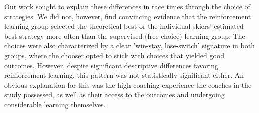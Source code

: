 Our work sought to explain these differences in race times through the choice of strategies. We did not, however,  find convincing evidence that the reinforcement learning group selected the theoretical best or the individual skiers' estimated best strategy more often than the supervised (free choice) learning group. The choices were also characterized by a clear 'win-stay, lose-switch' signature in both groups, where the chooser opted to stick with choices that yielded good outcomes. However, despite significant descriptive differences favoring reinforcement learning, this pattern was not statistically significant either. An obvious explanation for this was the high coaching experience the coaches in the study possessed, as well as their access to the outcomes and undergoing considerable learning themselves. 